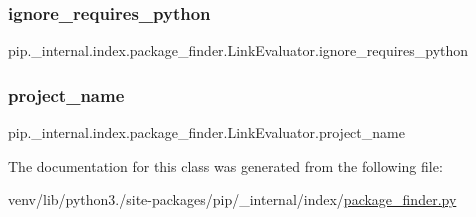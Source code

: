 \subsubsection{\texorpdfstring{ignore\+\_\+requires\+\_\+python}{ignore\_requires\_python}}
{\footnotesize\ttfamily pip.\+\_\+internal.\+index.\+package\+\_\+finder.\+Link\+Evaluator.\+ignore\+\_\+requires\+\_\+python\hspace{0.3cm}{\ttfamily [static]}}

\mbox{\label{classpip_1_1__internal_1_1index_1_1package__finder_1_1LinkEvaluator_a863c5807bac2d54e03b1269df84ef341}} 
\subsubsection{\texorpdfstring{project\+\_\+name}{project\_name}}
{\footnotesize\ttfamily pip.\+\_\+internal.\+index.\+package\+\_\+finder.\+Link\+Evaluator.\+project\+\_\+name\hspace{0.3cm}{\ttfamily [static]}}



The documentation for this class was generated from the following file\+:\begin{DoxyCompactItemize}
\item 
venv/lib/python3./site-\/packages/pip/\+\_\+internal/index/\hyperlink{package__finder_8py}{package\+\_\+finder.\+py}\end{DoxyCompactItemize}
